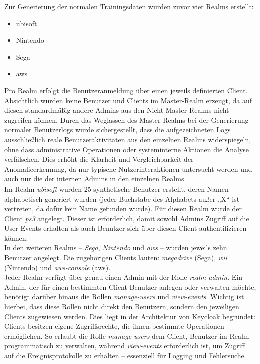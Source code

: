 \documentclass[a4paper,12pt]{article}
\begin{document}
	Zur Generierung der normalen Trainingsdaten wurden zuvor vier Realms erstellt:
	
	\begin{itemize}
		\item ubisoft
		\item Nintendo
		\item Sega
		\item aws
	\end{itemize}
	
	Pro Realm erfolgt die Benutzeranmeldung über einen jeweils definierten Client. Absichtlich wurden keine Benutzer und Clients im Master-Realm erzeugt, da auf diesen standardmäßig andere Admins aus den Nicht-Master-Realms nicht zugreifen können. Durch das Weglassen des Master-Realms bei der Generierung normaler Benutzerlogs wurde sichergestellt, dass die aufgezeichneten Logs ausschließlich reale Benutzeraktivitäten aus den einzelnen Realms widerspiegeln, ohne dass administrative Operationen oder systeminterne Aktionen die Analyse verfälschen. Dies erhöht die Klarheit und Vergleichbarkeit der Anomalieerkennung, da nur typische Nutzerinteraktionen untersucht werden und auch nur die der internen Admins in den einzelnen Realms.
	\\[0.5em]
	Im Realm \textit{ubisoft} wurden 25 synthetische Benutzer erstellt, deren Namen alphabetisch generiert wurden (jeder Buchstabe des Alphabets außer „X“ ist vertreten, da dafür kein Name gefunden wurde). Für diesen Realm wurde der Client \textit{ps3} angelegt. Dieser ist erforderlich, damit sowohl Admins Zugriff auf die User-Events erhalten als auch Benutzer sich über diesen Client authentifizieren können.
	\\[0.5em]
	In den weiteren Realms – \textit{Sega}, \textit{Nintendo} und \textit{aws} – wurden jeweils zehn Benutzer angelegt. Die zugehörigen Clients lauten: \textit{megadrive} (Sega), \textit{wii} (Nintendo) und \textit{aws-console} (aws).
	\\[0.5em]
	Jeder Realm verfügt über genau einen Admin mit der Rolle \textit{realm-admin}. Ein Admin, der für einen bestimmten Client Benutzer anlegen oder verwalten möchte, benötigt darüber hinaus die Rollen \textit{manage-users} und \textit{view-events}. Wichtig ist hierbei, dass diese Rollen nicht direkt den Benutzern, sondern den jeweiligen Clients zugewiesen werden. Dies liegt in der Architektur von Keycloak begründet: Clients besitzen eigene Zugriffsrechte, die ihnen bestimmte Operationen ermöglichen. So erlaubt die Rolle \textit{manage-users} dem Client, Benutzer im Realm programmatisch zu verwalten, während \textit{view-events} erforderlich ist, um Zugriff auf die Ereignisprotokolle zu erhalten – essenziell für Logging und Fehlersuche.
	\\[0.5em]
	
\end{document}
